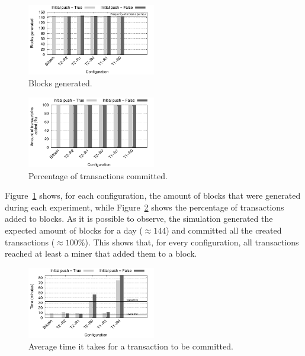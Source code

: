\documentclass{dads}   %
\begin{document}
\begin{figure}[t]
\centering
\includegraphics[width=0.5\textwidth]{plots/blocks-gen.pdf}
\caption{Blocks generated.}
\label{fig:nb-blocks}
\end{figure}

\begin{figure}[t]
\centering
\includegraphics[width=0.5\textwidth]{plots/tx-added.pdf}
\caption{Percentage of transactions committed.}
\label{fig:tx-added}
\end{figure}

Figure~\ref{fig:nb-blocks} shows, for each configuration, the amount of blocks that were generated during each experiment, while Figure~\ref{fig:tx-added} shows the percentage of transactions added to blocks. As it is possible to observe, the simulation generated the expected amount of blocks for a day ($\approx 144$) and committed all the created transactions ($\approx 100\%$). This shows that, for every configuration, all transactions reached at least a miner that added them to a block.

\begin{figure}[t]
\centering
\includegraphics[width=0.5\textwidth]{plots/commit-time.pdf}
\caption{Average time it takes for a transaction to be committed.}
\label{fig:commit-time}
\end{figure}
\end{document}

